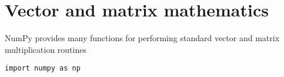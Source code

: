 \documentclass[numpymain.tex]{subfiles}
\begin{document}
\section{Vector and matrix mathematics }


NumPy provides many functions for performing standard vector and matrix multiplication routines

\begin{framed}
\begin{verbatim}
import numpy as np
\end{verbatim}
\end{framed}


\end{document}
